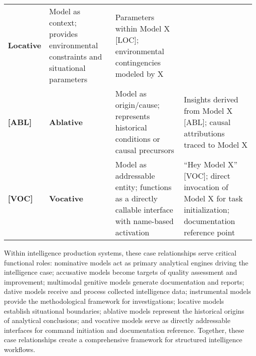 \begin{longtable}[]{@{}llll@{}}
\begin{minipage}[t]{0.11\columnwidth}
\textbf{Locative}\strut
\end{minipage} & \begin{minipage}[t]{0.40\columnwidth}\raggedright
Model as context; provides environmental constraints and situational
parameters\strut
\end{minipage} & \begin{minipage}[t]{0.27\columnwidth}\raggedright
Parameters within Model X {[}LOC{]}; environmental contingencies modeled
by X\strut
\end{minipage}\tabularnewline
\begin{minipage}[t]{0.11\columnwidth}\raggedright
\textbf{{[}ABL{]}}\strut
\end{minipage} & \begin{minipage}[t]{0.11\columnwidth}\raggedright
\textbf{Ablative}\strut
\end{minipage} & \begin{minipage}[t]{0.40\columnwidth}\raggedright
Model as origin/cause; represents historical conditions or causal
precursors\strut
\end{minipage} & \begin{minipage}[t]{0.27\columnwidth}\raggedright
Insights derived from Model X {[}ABL{]}; causal attributions traced to
Model X\strut
\end{minipage}\tabularnewline
\begin{minipage}[t]{0.11\columnwidth}\raggedright
\textbf{{[}VOC{]}}\strut
\end{minipage} & \begin{minipage}[t]{0.11\columnwidth}\raggedright
\textbf{Vocative}\strut
\end{minipage} & \begin{minipage}[t]{0.40\columnwidth}\raggedright
Model as addressable entity; functions as a directly callable interface
with name-based activation\strut
\end{minipage} & \begin{minipage}[t]{0.27\columnwidth}\raggedright
``Hey Model X'' {[}VOC{]}; direct invocation of Model X for task
initialization; documentation reference point\strut
\end{minipage}\tabularnewline
\bottomrule
\end{longtable}

Within intelligence production systems, these case relationships serve
critical functional roles: nominative models act as primary analytical
engines driving the intelligence case; accusative models become targets
of quality assessment and improvement; multimodal genitive models
generate documentation and reports; dative models receive and process
collected intelligence data; instrumental models provide the
methodological framework for investigations; locative models establish
situational boundaries; ablative models represent the historical origins
of analytical conclusions; and vocative models serve as directly
addressable interfaces for command initiation and documentation
reference. Together, these case relationships create a comprehensive
framework for structured intelligence workflows.

